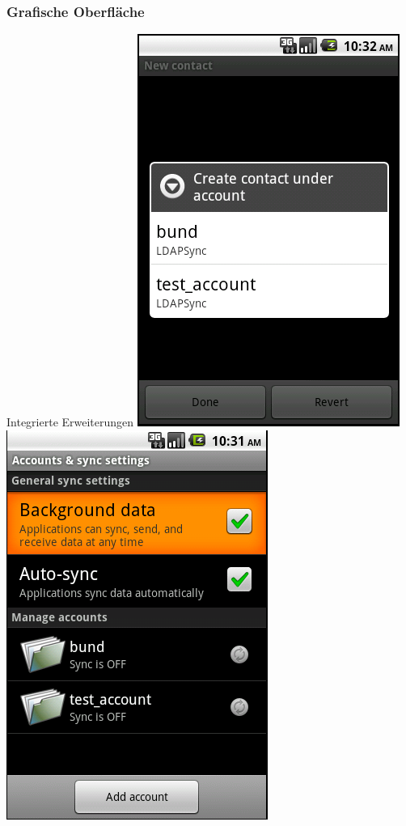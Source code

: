 \documentclass[hyperref={bookmarksopen=false}]{beamer}
\begin{document}
\begin{frame}[fragile]
	\frametitle{Grafische Oberfläche}
	\begin{block}{Integrierte Erweiterungen}
	\hspace{0.5 cm}
	\includegraphics[scale=0.3]{createContact_chooseAccount.png}
	\vspace{1 cm}
	\includegraphics[scale=0.3]{Accounts_Sync.png}
	\end{block}
\end{frame}
\end{document}
